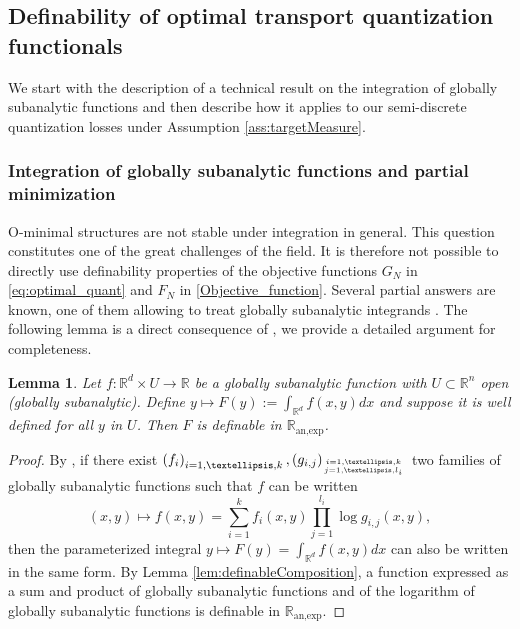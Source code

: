 \documentclass[11pt]{article}
\newcommand{\R}{\mathbb R}
\newcommand{\1}{\mathbbm{1}}
\newtheorem{lem}{Lemma}[section]
\numberwithin{equation}{section}
\begin{document}
\subsection{Definability of optimal transport quantization functionals}
\label{sec:definability_quantization}
We start with the description of a technical result on the integration of globally subanalytic functions \cite{Cluckers2009StabilityUI} and then describe how it applies to our semi-discrete quantization losses under Assumption \ref{ass:targetMeasure}.

\subsubsection{Integration of globally subanalytic functions and partial minimization}
O-minimal structures are not stable under integration in general. This question constitutes one of the great challenges of the field. It is therefore not possible to directly use definability properties of the objective functions $G_N$ in \eqref{eq:optimal_quant} and $F_N$ in \eqref{Objective_function}.
Several partial answers are known, one of them allowing to treat globally subanalytic integrands \cite{lion1998integration,comte2000nature,Cluckers2009StabilityUI}.
The following lemma is a direct consequence of \cite[Theorem 1.3]{Cluckers2009StabilityUI}, we provide a detailed argument for completeness. 


\begin{lem}\label{integrale_def}
	Let $f:\mathbb{R}^{d}\times U\longrightarrow \mathbb{R}$ be a globally subanalytic function with $U\subset \R^n$ open (globally subanalytic). Define  $y\mapsto F(y):=\int_{\mathbb{R}^{d}}f(x,y)dx$ and suppose it is well defined for all $y$ in $U$. Then $F$ is definable in $\mathbb{R}_\text{an,exp}$.
\end{lem}

\begin{proof}
	By \cite[Theorem 1.3]{Cluckers2009StabilityUI}, if there exist $\left(f_{i}\right)_{i=1,\ldots,k}, (g_{i,j})_{\genfrac{}{}{0pt}{}{i=1,\ldots,k}{j=1,\ldots,l_{i}}}$ two families of globally subanalytic functions such that $f$ can be written
\begin{equation}\label{sum_product_log_restr_analy}
    (x,y)\mapsto f(x,y)=\sum_{i=1}^{k}f_{i}(x,y)\prod_{j=1}^{l_{i}}\log g_{i,j}(x,y),
\end{equation}
	then the parameterized integral $y\mapsto F(y)=\int_{\mathbb{R}^{d}}f(x,y)dx$ can also be written in the same form. By Lemma \ref{lem:definableComposition}, a function expressed as a sum and product of globally subanalytic functions and of the logarithm of globally subanalytic functions is definable in $\mathbb{R}_\text{an,exp}$.
\end{proof}
\end{document}
